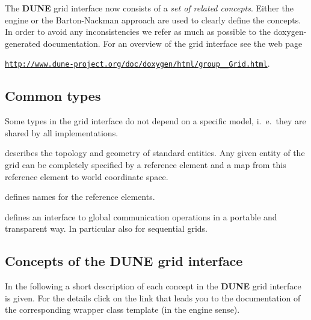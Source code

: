 \documentclass[11pt,a4paper,headinclude,footinclude,DIV16,normalheadings]{scrreprt}
\newcommand{\Dune}{{\sf\bfseries DUNE}\xspace}
\begin{document}
The \Dune{} grid interface now consists of a \textit{set of related concepts}.
Either the engine or the Barton-Nackman approach are used to clearly
define the concepts. In order to avoid any inconsistencies we refer as
much as possible to the doxygen-generated documentation. For an
overview of the grid interface see the web page 
\begin{center}
\href{http://www.dune-project.org/doc/doxygen/html/group__Grid.html}%
{\texttt{http://www.dune-project.org/doc/doxygen/html/group\_\_Grid.html}}.
\end{center}



\subsection{Common types}

Some types in the grid interface do not depend on a specific model,
i.~e.~they are shared by all implementations.


describes the topology and geometry of standard entities. Any given
entity of the grid can be completely specified by a reference element
and a map from this reference element to world coordinate space. 


defines names for the reference elements.


defines an interface to global communication operations in a portable
and transparent way. In particular also for sequential grids. 


\subsection{Concepts of the \texorpdfstring{\Dune{}}{DUNE} grid interface}

In the following a short description of each concept in the \Dune{}
grid interface is given. For the details click on the link that leads
you to the documentation of the corresponding wrapper class template 
(in the engine sense).

\end{document}
